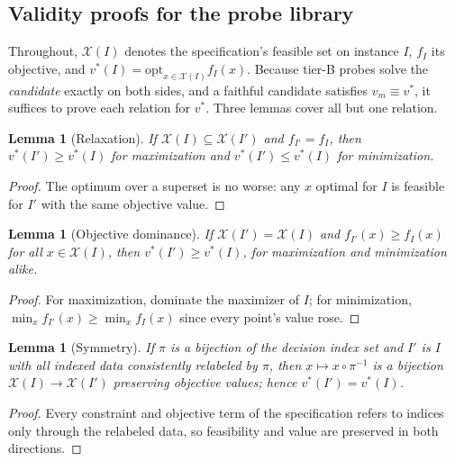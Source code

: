 \documentclass[pdflatex,sn-mathphys-num]{sn-jnl}
\theoremstyle{thmstyleone}
\newtheorem{lemma}[theorem]{Lemma}
\theoremstyle{thmstyletwo}
\begin{document}
\begin{appendices}

\section{Validity proofs for the probe library}\label{app:proofs}

Throughout, $\mathcal{X}(I)$ denotes the specification's feasible set
on instance $I$, $f_I$ its objective, and
$v^\ast(I) = \mathrm{opt}_{x \in \mathcal{X}(I)} f_I(x)$. Because
tier-B probes solve the \emph{candidate} exactly on both sides, and a
faithful candidate satisfies $v_m \equiv v^\ast$, it suffices to
prove each relation for $v^\ast$. Three lemmas cover all but one
relation.

\begin{lemma}[Relaxation]\label{lem:relax}
If $\mathcal{X}(I) \subseteq \mathcal{X}(I')$ and $f_{I'} = f_I$,
then $v^\ast(I') \ge v^\ast(I)$ for maximization and
$v^\ast(I') \le v^\ast(I)$ for minimization.
\end{lemma}
\begin{proof}
The optimum over a superset is no worse: any $x$ optimal for $I$ is
feasible for $I'$ with the same objective value.
\end{proof}

\begin{lemma}[Objective dominance]\label{lem:dom}
If $\mathcal{X}(I') = \mathcal{X}(I)$ and
$f_{I'}(x) \ge f_I(x)$ for all $x \in \mathcal{X}(I)$, then
$v^\ast(I') \ge v^\ast(I)$, for maximization and minimization alike.
\end{lemma}
\begin{proof}
For maximization, dominate the maximizer of $I$; for minimization,
$\min_x f_{I'}(x) \ge \min_x f_I(x)$ since every point's value rose.
\end{proof}

\begin{lemma}[Symmetry]\label{lem:sym}
If $\pi$ is a bijection of the decision index set and $I'$ is $I$
with all indexed data consistently relabeled by $\pi$, then
$x \mapsto x \circ \pi^{-1}$ is a bijection
$\mathcal{X}(I) \to \mathcal{X}(I')$ preserving objective values;
hence $v^\ast(I') = v^\ast(I)$.
\end{lemma}
\begin{proof}
Every constraint and objective term of the specification refers to
indices only through the relabeled data, so feasibility and value are
preserved in both directions.
\end{proof}


\end{appendices}
\end{document}
